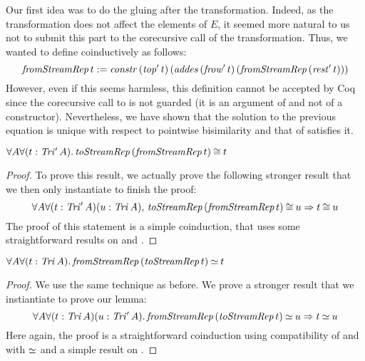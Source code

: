 \begin{remark}
  Our first idea was to do the gluing after the
  transformation. Indeed, as the transformation does not affect the
  elements of $E$, it seemed more natural to us not to submit this
  part to the corecursive call of the transformation.
  Thus, we wanted to define \fSR{} coinductively as follows:
  $$ \mathit{fromStreamRep}\,t := \mathit{constr}\,(\mathit{top'}\,t)\,(\mathit{addes}\,(\mathit{frow'}\,t)\,(\mathit{fromStreamRep}\,
  (\mathit{rest'}\,t)))$$
  However, even if this seems harmless, this definition cannot be
  accepted by Coq since the corecursive call to \fSR{} is not
  guarded (it is an argument of \addes{} and not of a constructor). Nevertheless, we have shown that the solution to the
  previous equation is unique with respect to pointwise bisimilarity and that
  \fSR{} of  satisfies it. 
\end{remark}
\begin{lemma}\label{lemma:tSR_fSR}
  $\forall A\forall(t:\mathit{Tri'}\,A).\, \mathit{toStreamRep}\, (\mathit{fromStreamRep}\,t) \mathbin{\cong} t$
\end{lemma}
\begin{proof}
  To prove this result, we actually prove the following stronger
  result that we then only instantiate to finish the proof: 
  $$\forall A\forall (t:\mathit{Tri'}\,A)(u:\mathit{Tri}\,A),\, \mathit{toStreamRep} \,(\mathit{fromStreamRep}\,t) \mathbin{\cong} u \Rightarrow t \mathbin{\cong} u $$
  The proof of this statement is a simple coinduction, that uses some
  straightforward results on \cut{} and \addesS{}. 
\end{proof}
\begin{lemma}\label{lemma:fSR_tSR}
  $\forall A\forall (t:\mathit{Tri}\,A).\, \mathit{fromStreamRep}\, (\mathit{toStreamRep}\,t) \mathbin{\simeq} t$
\end{lemma}
\begin{proof}
  We use the same technique as before. We prove a stronger result that
  we instiantiate to prove our lemma: 
  $$\forall A\forall (t:\mathit{Tri}\,A)(u:\mathit{Tri'}\,A).\, \mathit{fromStreamRep}\, (\mathit{toStreamRep}\,t) \mathbin{\simeq} u \Rightarrow t \mathbin{\simeq} u $$
  Here again, the proof is a straightforward coinduction using
  compatibility of \topT{} and \rest{} with $\mathbin{\simeq}$ and a simple result on \addesS.
\end{proof}

